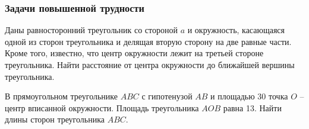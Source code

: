 \documentclass[geometry,a5paper]{pum}
\begin{document}
\begin{exercises}
\subsubsection*{Задачи повышенной трудности}
  \begin{question}
    Даны равносторонний треугольник со стороной $a$ и окружность, касающаяся одной из сторон треугольника и делящая вторую сторону на две равные части. Кроме того, известно, что центр окружности лежит на третьей стороне треугольника. Найти расстояние от центра окружности до ближайшей вершины треугольника.
  \end{question}
  \begin{question}
    В прямоугольном треугольнике $ABC$ с гипотенузой $AB$ и площадью 30 точка $O$ -- центр вписанной окружности. Площадь треугольника $AOB$ равна 13. Найти длины сторон треугольника $ABC$.

  \end{question}
\end{exercises}
\end{document}
